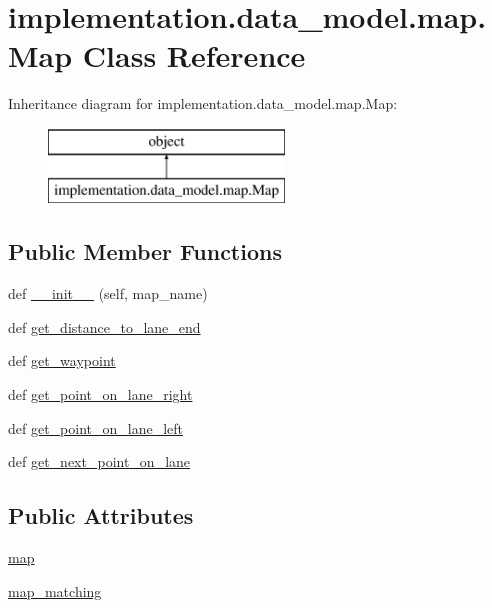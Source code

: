 \hypertarget{classimplementation_1_1data__model_1_1map_1_1_map}{}\section{implementation.\+data\+\_\+model.\+map.\+Map Class Reference}
\label{classimplementation_1_1data__model_1_1map_1_1_map}
Inheritance diagram for implementation.\+data\+\_\+model.\+map.\+Map\+:\begin{figure}[H]
\begin{center}
\leavevmode
\includegraphics[height=2.000000cm]{classimplementation_1_1data__model_1_1map_1_1_map}
\end{center}
\end{figure}
\subsection*{Public Member Functions}
\begin{DoxyCompactItemize}
\item 
def \hyperlink{classimplementation_1_1data__model_1_1map_1_1_map_a4fc6942eed69c519ac3b34ff2ff0a92d}{\+\_\+\+\_\+init\+\_\+\+\_\+} (self, map\+\_\+name)
\item 
def \hyperlink{classimplementation_1_1data__model_1_1map_1_1_map_aa594532ade53c7e6ec730e657e383271}{get\+\_\+distance\+\_\+to\+\_\+lane\+\_\+end}
\item 
def \hyperlink{classimplementation_1_1data__model_1_1map_1_1_map_a03736a8ebf18a875f53992b977736108}{get\+\_\+waypoint}
\item 
def \hyperlink{classimplementation_1_1data__model_1_1map_1_1_map_a815310646f53527f0be529d336b0317c}{get\+\_\+point\+\_\+on\+\_\+lane\+\_\+right}
\item 
def \hyperlink{classimplementation_1_1data__model_1_1map_1_1_map_a799206c287976e7291ffbe509c3754ce}{get\+\_\+point\+\_\+on\+\_\+lane\+\_\+left}
\item 
def \hyperlink{classimplementation_1_1data__model_1_1map_1_1_map_afc749937439c4c831c1061928563030a}{get\+\_\+next\+\_\+point\+\_\+on\+\_\+lane}
\end{DoxyCompactItemize}
\subsection*{Public Attributes}
\begin{DoxyCompactItemize}
\item 
\hyperlink{classimplementation_1_1data__model_1_1map_1_1_map_a9c9d66086867f8a00ed50f814a4323b1}{map}
\item 
\hyperlink{classimplementation_1_1data__model_1_1map_1_1_map_a0a36c23f92da7063d8377fc83c373128}{map\+\_\+matching}
\end{DoxyCompactItemize}


